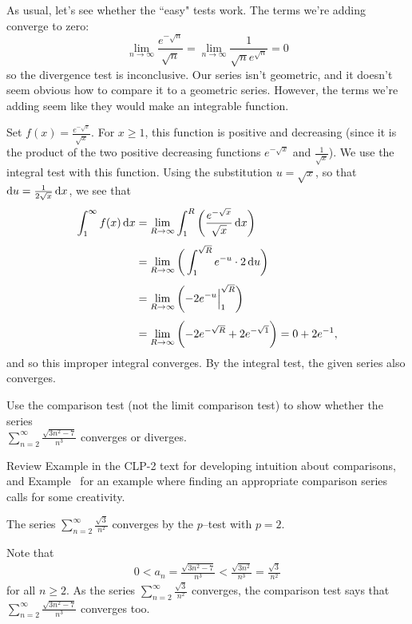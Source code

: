 \begin{solution}
As usual, let's see whether the ``easy" tests work. The terms we're adding converge to zero:
\[\lim_{n \to \infty}\frac{e^{-\sqrt{n}}}{\sqrt{n}}=\lim_{n \to \infty}\frac{1}{\sqrt{n}e^{\sqrt{n}}}=0 \]
so the divergence test is inconclusive. Our series isn't geometric, and it doesn't seem obvious how to compare it to a geometric series. However, the terms we're adding seem like they would make an integrable function.

Set $f(x)=\frac{e^{-\sqrt{x}}}{\sqrt{x}}$. For $x\ge1$,
this function is positive and decreasing (since it is the product of
the two positive decreasing functions $e^{-\sqrt x}$ and $\frac1{\sqrt x}$).
We use the integral test with this function.
Using the substitution $u=\sqrt x$, so that
$\mathrm{d}u = \frac1{2\sqrt x}\,\mathrm{d}x$, we see that
\begin{align*}
\int_1^\infty f(x)\,\mathrm{d}x
&=\lim_{R\rightarrow\infty}\int_1^R \bigg( \frac{e^{-\sqrt{x}}}{\sqrt{x}}\,\mathrm{d}x \bigg) \\[0.05in]
&=\lim_{R\rightarrow\infty} \bigg( \int_1^{\sqrt{R}} e^{-u}\cdot2\,\mathrm{d}u \bigg) \\[0.05in]
&=\lim_{R\rightarrow\infty} \bigg( {-}2e^{-u}\Big|_1^{\sqrt{R}} \bigg) \\[0.05in]
&=\lim_{R\rightarrow\infty} \bigg( {-}2e^{-\sqrt R} + 2e^{-\sqrt1} \bigg)
= 0 + 2e^{-1},
\end{align*}
and so this improper integral converges. By the integral test,
the given series also converges.
\end{solution}


\begin{question}[2016Q6]
Use the comparison test (not the limit comparison test) to show whether the series \\
$\displaystyle \sum_{n=2}^{\infty} \frac{\sqrt{3 n^2 - 7}}{n^{3}}$ converges or diverges.
\end{question}

\begin{hint}
Review Example  in the
CLP-2 text for developing intuition about comparisons, and Example~ for an example where finding an appropriate comparison series calls for some creativity.
\end{hint}

\begin{answer}
The series $\displaystyle \sum_{n=2}^{\infty} \frac{\sqrt{3}}{n^2}$
converges by the $p$--test with $p=2$.

Note that
\begin{align*}
 0< a_n = \frac{\sqrt{3 n^2 - 7}}{n^3} < \frac{\sqrt{3n^2}}{n^3} = \frac{\sqrt{3}}{n^2}
\end{align*}
for all $n\ge 2$. As the series $\sum\limits_{n=2}^\infty \frac{\sqrt3}{n^2}$ converges,
 the comparison test says that $\sum\limits_{n=2}^\infty  \frac{\sqrt{3 n^2 - 7}}{n^{3}}$ converges too.
\end{answer}

